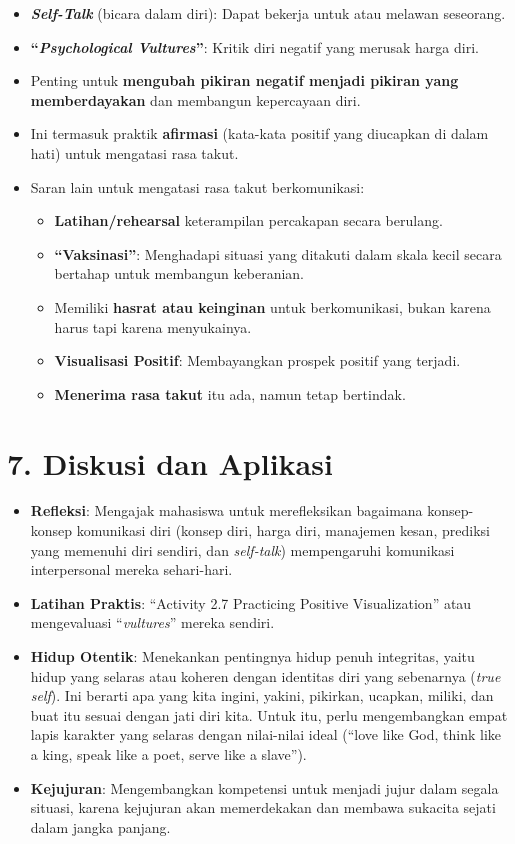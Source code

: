 \documentclass[
  letterpaper,
  DIV=11,
  numbers=noendperiod]{scrreprt}
\providecommand{\tightlist}{%
  \setlength{\itemsep}{0pt}\setlength{\parskip}{0pt}}
\begin{document}
\begin{itemize}
\tightlist
\item
  \textbf{\emph{Self-Talk}} (bicara dalam diri): Dapat bekerja untuk
  atau melawan seseorang.
\item
  \textbf{``\emph{Psychological Vultures}''}: Kritik diri negatif yang
  merusak harga diri.
\item
  Penting untuk \textbf{mengubah pikiran negatif menjadi pikiran yang
  memberdayakan} dan membangun kepercayaan diri.
\item
  Ini termasuk praktik \textbf{afirmasi} (kata-kata positif yang
  diucapkan di dalam hati) untuk mengatasi rasa takut.
\item
  Saran lain untuk mengatasi rasa takut berkomunikasi:

  \begin{itemize}
  \tightlist
  \item
    \textbf{Latihan/rehearsal} keterampilan percakapan secara berulang.
  \item
    \textbf{``Vaksinasi''}: Menghadapi situasi yang ditakuti dalam skala
    kecil secara bertahap untuk membangun keberanian.
  \item
    Memiliki \textbf{hasrat atau keinginan} untuk berkomunikasi, bukan
    karena harus tapi karena menyukainya.
  \item
    \textbf{Visualisasi Positif}: Membayangkan prospek positif yang
    terjadi.
  \item
    \textbf{Menerima rasa takut} itu ada, namun tetap bertindak.
  \end{itemize}
\end{itemize}

\section{7. Diskusi dan Aplikasi}\label{diskusi-dan-aplikasi}

\begin{itemize}
\tightlist
\item
  \textbf{Refleksi}: Mengajak mahasiswa untuk merefleksikan bagaimana
  konsep-konsep komunikasi diri (konsep diri, harga diri, manajemen
  kesan, prediksi yang memenuhi diri sendiri, dan \emph{self-talk})
  mempengaruhi komunikasi interpersonal mereka sehari-hari.
\item
  \textbf{Latihan Praktis}: ``Activity 2.7 Practicing Positive
  Visualization'' atau mengevaluasi ``\emph{vultures}'' mereka sendiri.
\item
  \textbf{Hidup Otentik}: Menekankan pentingnya hidup penuh integritas,
  yaitu hidup yang selaras atau koheren dengan identitas diri yang
  sebenarnya (\emph{true self}). Ini berarti apa yang kita ingini,
  yakini, pikirkan, ucapkan, miliki, dan buat itu sesuai dengan jati
  diri kita. Untuk itu, perlu mengembangkan empat lapis karakter yang
  selaras dengan nilai-nilai ideal (``love like God, think like a king,
  speak like a poet, serve like a slave'').
\item
  \textbf{Kejujuran}: Mengembangkan kompetensi untuk menjadi jujur dalam
  segala situasi, karena kejujuran akan memerdekakan dan membawa
  sukacita sejati dalam jangka panjang.
\end{itemize}
\end{document}

